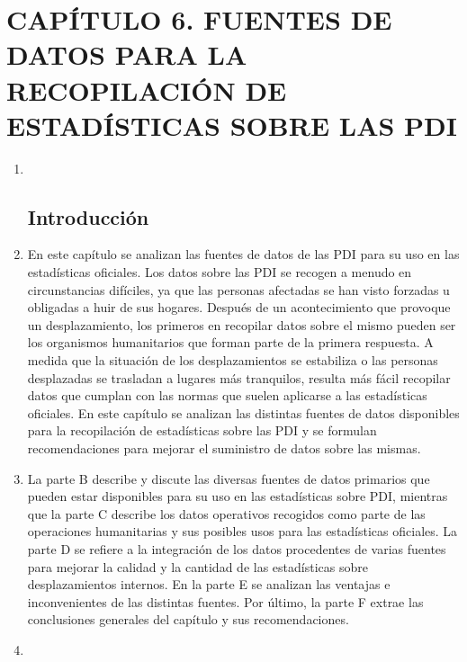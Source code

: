 \documentclass[
]{book}
\begin{document}
\hypertarget{capuxedtulo-6.-fuentes-de-datos-para-la-recopilaciuxf3n-de-estaduxedsticas-sobre-las-pdi}{%
\chapter{CAPÍTULO 6. FUENTES DE DATOS PARA LA RECOPILACIÓN DE ESTADÍSTICAS SOBRE LAS PDI}\label{capuxedtulo-6.-fuentes-de-datos-para-la-recopilaciuxf3n-de-estaduxedsticas-sobre-las-pdi}}

\begin{enumerate}
\def\labelenumi{\arabic{enumi}.}
\item ~
  \hypertarget{introducciuxf3n-4}{%
  \section{Introducción}\label{introducciuxf3n-4}}
\item
  En este capítulo se analizan las fuentes de datos de las PDI para su uso en las estadísticas oficiales. Los datos sobre las PDI se recogen a menudo en circunstancias difíciles, ya que las personas afectadas se han visto forzadas u obligadas a huir de sus hogares. Después de un acontecimiento que provoque un desplazamiento, los primeros en recopilar datos sobre el mismo pueden ser los organismos humanitarios que forman parte de la primera respuesta. A medida que la situación de los desplazamientos se estabiliza o las personas desplazadas se trasladan a lugares más tranquilos, resulta más fácil recopilar datos que cumplan con las normas que suelen aplicarse a las estadísticas oficiales. En este capítulo se analizan las distintas fuentes de datos disponibles para la recopilación de estadísticas sobre las PDI y se formulan recomendaciones para mejorar el suministro de datos sobre las mismas.
\item
  La parte B describe y discute las diversas fuentes de datos primarios que pueden estar disponibles para su uso en las estadísticas sobre PDI, mientras que la parte C describe los datos operativos recogidos como parte de las operaciones humanitarias y sus posibles usos para las estadísticas oficiales. La parte D se refiere a la integración de los datos procedentes de varias fuentes para mejorar la calidad y la cantidad de las estadísticas sobre desplazamientos internos. En la parte E se analizan las ventajas e inconvenientes de las distintas fuentes. Por último, la parte F extrae las conclusiones generales del capítulo y sus recomendaciones.
\item ~
  \hypertarget{panorama-de-las-fuentes-de-datos-sobre-pdi}{%
}
\end{enumerate}
\end{document}

